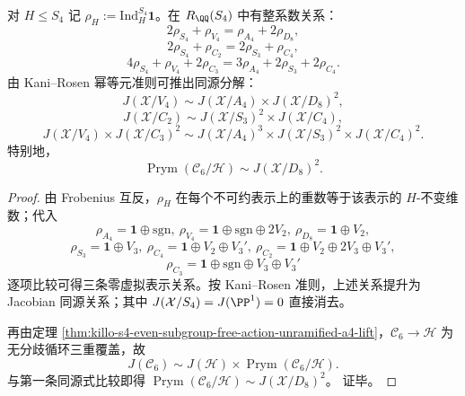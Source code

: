\begin{theorem}\label{thm:killo-s4-burnside-kani-rosen-prym-square}
对 \(H\le S_4\) 记 \(\rho_H:=\mathrm{Ind}_{H}^{S_4}\mathbf 1\)。在 \(R_{\QQ}(S_4)\) 中有整系数关系：
\[
2\rho_{S_4}+\rho_{V_4}=\rho_{A_4}+2\rho_{D_8},
\]
\[
2\rho_{S_4}+\rho_{C_2}=2\rho_{S_3}+\rho_{C_4},
\]
\[
4\rho_{S_4}+\rho_{V_4}+2\rho_{C_3}=3\rho_{A_4}+2\rho_{S_3}+2\rho_{C_4}.
\]
由 Kani--Rosen 幂等元准则可推出同源分解：
\[
J(\mathcal X/V_4)\sim J(\mathcal X/A_4)\times J(\mathcal X/D_8)^2,
\]
\[
J(\mathcal X/C_2)\sim J(\mathcal X/S_3)^2\times J(\mathcal X/C_4),
\]
\[
J(\mathcal X/V_4)\times J(\mathcal X/C_3)^2
\sim
J(\mathcal X/A_4)^3\times J(\mathcal X/S_3)^2\times J(\mathcal X/C_4)^2.
\]
特别地，
\[
\operatorname{Prym}(\mathcal C_6/\mathcal H)\sim J(\mathcal X/D_8)^2.
\]
\end{theorem}
\begin{proof}
由 Frobenius 互反，\(\rho_H\) 在每个不可约表示上的重数等于该表示的 \(H\)-不变维数；代入
\[
\rho_{A_4}=\mathbf 1\oplus\mathrm{sgn},\ 
\rho_{V_4}=\mathbf 1\oplus\mathrm{sgn}\oplus 2V_2,\ 
\rho_{D_8}=\mathbf 1\oplus V_2,
\]
\[
\rho_{S_3}=\mathbf 1\oplus V_3,\ 
\rho_{C_4}=\mathbf 1\oplus V_2\oplus V_3',\ 
\rho_{C_2}=\mathbf 1\oplus V_2\oplus 2V_3\oplus V_3',
\]
\[
\rho_{C_3}=\mathbf 1\oplus\mathrm{sgn}\oplus V_3\oplus V_3'
\]
逐项比较可得三条零虚拟表示关系。按 Kani--Rosen 准则，上述关系提升为 Jacobian 同源关系；其中 \(J(\mathcal X/S_4)=J(\PP^1)=0\) 直接消去。

再由定理 \ref{thm:killo-s4-even-subgroup-free-action-unramified-a4-lift}，\(\mathcal C_6\to\mathcal H\) 为无分歧循环三重覆盖，故
\[
J(\mathcal C_6)\sim J(\mathcal H)\times \operatorname{Prym}(\mathcal C_6/\mathcal H).
\]
与第一条同源式比较即得
\(
\operatorname{Prym}(\mathcal C_6/\mathcal H)\sim J(\mathcal X/D_8)^2
\)。
证毕。
\end{proof}


